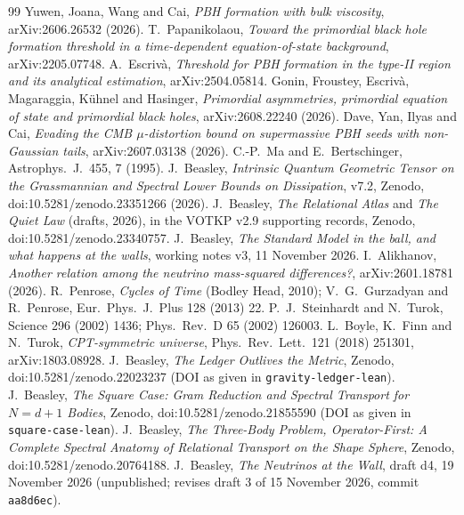 \documentclass[11pt]{article}
\begin{document}
\begin{thebibliography}{99}
 Yuwen, Joana, Wang and Cai, \emph{PBH formation with bulk viscosity}, arXiv:2606.26532 (2026).
 T.~Papanikolaou, \emph{Toward the primordial black hole formation threshold in a time-dependent equation-of-state background}, arXiv:2205.07748.
 A.~Escriv\`a, \emph{Threshold for PBH formation in the type-II region and its analytical estimation}, arXiv:2504.05814.
 Gonin, Froustey, Escriv\`a, Magaraggia, K\"uhnel and Hasinger, \emph{Primordial asymmetries, primordial equation of state and primordial black holes}, arXiv:2608.22240 (2026).
 Dave, Yan, Ilyas and Cai, \emph{Evading the CMB $\mu$-distortion bound on supermassive PBH seeds with non-Gaussian tails}, arXiv:2607.03138 (2026).
 C.-P.~Ma and E.~Bertschinger, Astrophys.\ J.\ 455, 7 (1995).
 J.~Beasley, \emph{Intrinsic Quantum Geometric Tensor on the Grassmannian and Spectral Lower Bounds on Dissipation}, v7.2, Zenodo, doi:10.5281/zenodo.23351266 (2026).
 J.~Beasley, \emph{The Relational Atlas} and \emph{The Quiet Law} (drafts, 2026), in the VOTKP v2.9 supporting records, Zenodo, doi:10.5281/zenodo.23340757.
 J.~Beasley, \emph{The Standard Model in the ball, and what happens at the walls}, working notes v3, 11 November 2026.
 I.~Alikhanov, \emph{Another relation among the neutrino mass-squared differences?}, arXiv:2601.18781 (2026).
 R.~Penrose, \emph{Cycles of Time} (Bodley Head, 2010); V.~G.~Gurzadyan and R.~Penrose, Eur.\ Phys.\ J.\ Plus 128 (2013) 22.
 P.~J.~Steinhardt and N.~Turok, Science 296 (2002) 1436; Phys.\ Rev.\ D 65 (2002) 126003.
 L.~Boyle, K.~Finn and N.~Turok, \emph{CPT-symmetric universe}, Phys.\ Rev.\ Lett.\ 121 (2018) 251301, arXiv:1803.08928.
 J.~Beasley, \emph{The Ledger Outlives the Metric}, Zenodo, doi:10.5281/zenodo.22023237 (DOI as given in \texttt{gravity-ledger-lean}).
 J.~Beasley, \emph{The Square Case: Gram Reduction and Spectral Transport for $N=d+1$ Bodies}, Zenodo, doi:10.5281/zenodo.21855590 (DOI as given in \texttt{square-case-lean}).
 J.~Beasley, \emph{The Three-Body Problem, Operator-First: A Complete Spectral Anatomy of Relational Transport on the Shape Sphere}, Zenodo, doi:10.5281/zenodo.20764188.
 J.~Beasley, \emph{The Neutrinos at the Wall}, draft d4, 19 November 2026 (unpublished; revises draft 3 of 15 November 2026, commit \texttt{aa8d6ec}).
\end{thebibliography}
\end{document}
